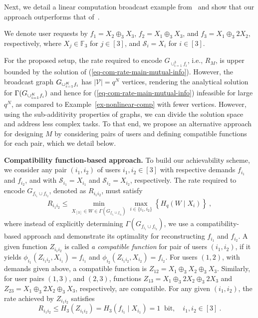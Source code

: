 \documentclass[conference, letterpaper]{IEEEtran} %
\begin{document}
Next, we detail a linear computation broadcast example from~\cite{yao2024capacity} and show that our approach outperforms that of~\cite{yao2024capacity}.


\begin{ex}
\label{ex-linear-comp-jafar}
We denote user requests by $f_{1}=X_{2}\oplus_{3}X_{3}$, $f_2=X_{1}\oplus_{3}X_{3}$, and $f_3=X_{1}\oplus_{3}2X_{2}$, respectively, where $X_{j}\in\mathbb{F}_3$ for $j\in[3]$, and $\mathcal{S}_{i}=X_{i}$ for $i\in [3]$. 

For the proposed setup, the rate required to encode $G_{\cup_{i=1}^{3}f_i}$, i.e., $R_{M}$, is upper bounded by the solution of (\ref{eq-com-rate-main-mutual-info}). However, the broadcast graph $G_{\cup_{i=1}^{K}f_i}$ has $|\mathcal{V}|=q^N$ vertices, rendering the analytical solution for $\Gamma(G_{\cup_{i=1}^{K}f_i})$ and hence for (\ref{eq-com-rate-main-mutual-info}) infeasible for large $q^N$, as compared to Example~\ref{ex-nonlinear-comp} with fewer vertices. 
However, using the sub-additivity properties of graphs, we can divide the solution space and address less complex tasks. 
To that end, we propose an alternative approach for designing $M$ by considering pairs of users and defining compatible functions for each pair, which we detail below.



{\bf Compatibility function-based approach.} To build our achievability scheme, we consider any pair $(i_1,i_2)$ of users $i_1,i_2\in [3]$ with respective demands $f_{i_1}$ and $f_{i_2}$, and with $\mathcal{S}_{i_1}=X_{i_1}$ and $\mathcal{S}_{i_2}=X_{i_2}$, respectively. The rate required to encode $G_{f_{i_{1}}\cup f_{i_{2}}}$, denoted as $R_{i_{1}i_{2}}$, must satisfy 
\begin{align}
    R_{i_{1}i_{2}}\leq \min_{X_{[3]}\in W\in \Gamma(G_{f_{i_{1}}\cup f_{i_{2}}})}\max_{i\in\{i_1,i_2\}}\left\{
    H_q(W\mid X_{i})\right\}\ ,\nonumber
\end{align}
where instead of explicitly determining $\Gamma(G_{f_{i_{1}}\cup f_{i_{2}}})$, we use a compatibility-based approach and demonstrate its optimality for reconstructing $f_{i_1}$ and $f_{i_2}$. %
A given function $Z_{{i_1}{i_2}}$ is called {\emph{a compatible function}} for pair of users $(i_{1},i_{2})$, if it yields $\phi_{i_1}(Z_{{i_1}{i_2}},X_{i_1})=f_{i_1}$ and $\phi_{i_2}(Z_{i_1 i_2},X_{i_2})=f_{i_2}$. For users $(1,2)$, with demands given above, a compatible function is $Z_{12}=X_{1}\oplus_{3} X_{2}\oplus_{3} X_{3}$. Similarly, for user pairs $(1,3)$, and $(2,3)$,  functions $Z_{13}=X_{1}\oplus_{3} 2 X_{2}\oplus_{3} 2X_{3}$ and $Z_{23}=X_{1}\oplus_{3} 2X_{2}\oplus_{3} X_{3}$, respectively, are compatible. For any given $(i_1,i_2)$, the rate achieved by $Z_{{i_1}{i_2}}$ satisfies
\begin{equation}
    R_{i_1i_2}\leq H_3(Z_{{i_1}{i_2}})=H_3(f_{i_1}\mid X_{i_1})=1 \:\text{ bit}, \quad i_1,i_2\in[3] \ .\nonumber
\end{equation}
 

\end{ex}
\end{document}
